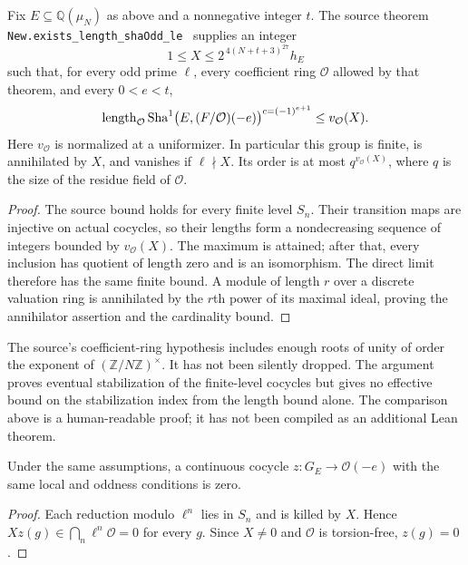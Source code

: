 \begin{corollary}
\label{cor:odd-sha-bound}
Fix $E\subseteq\mathbb Q(\mu_N)$ as above and a nonnegative integer $t$. The source
theorem \texttt{New.exists\_length\_shaOdd\_le}~\cite{oddsha} supplies an integer
\[
 1\le X\le 2^{\,4(N+t+3)^{27}}h_E
\]
such that, for every odd prime $\ell$, every coefficient ring $\mathcal O$
allowed by that theorem, and every $0<e<t$,
\[
 \operatorname{length}_{\mathcal O}
 \operatorname{Sha}^1\bigl(E,(F/\mathcal O)(-e)\bigr)^{c=(-1)^{e+1}}
 \le v_{\mathcal O}(X).
\]
Here $v_{\mathcal O}$ is normalized at a uniformizer. In particular this
group is finite, is annihilated by $X$, and vanishes if $\ell\nmid X$.
Its order is at most $q^{v_{\mathcal O}(X)}$, where $q$ is the size of the
residue field of $\mathcal O$.
\end{corollary}

\begin{proof}
The source bound holds for every finite level $S_n$. Their transition maps
are injective on actual cocycles, so their lengths form a nondecreasing
sequence of integers bounded by $v_{\mathcal O}(X)$. The maximum is attained;
after that, every inclusion has quotient of length zero and is an
isomorphism. The direct limit therefore has the same finite bound. A module
of length $r$ over a discrete valuation ring is annihilated by the $r$th
power of its maximal ideal, proving the annihilator assertion and the
cardinality bound.
\end{proof}

The source's coefficient-ring hypothesis includes enough roots of unity of
order the exponent of $(\mathbb Z/N\mathbb Z)^\times$. It has not been
silently dropped. The argument proves eventual stabilization of the
finite-level cocycles but gives no effective bound on the stabilization
index from the length bound alone. The comparison above is a human-readable
proof; it has not been compiled as an additional Lean theorem.

\begin{corollary}
Under the same assumptions, a continuous cocycle $z:G_E\to\mathcal O(-e)$
with the same local and oddness conditions is zero.
\end{corollary}
\begin{proof}
Each reduction modulo $\ell^n$ lies in $S_n$ and is killed by $X$. Hence
$Xz(g)\in\bigcap_n\ell^n\mathcal O=0$ for every $g$. Since $X\ne0$ and
$\mathcal O$ is torsion-free, $z(g)=0$.
\end{proof}


